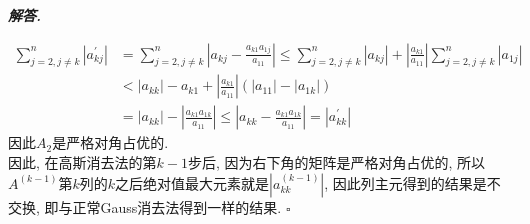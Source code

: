 \documentclass[10pt, a4paper, oneside]{ctexart}
\newenvironment{solution}{%
  \par\noindent\textbf{\textit{解答. }}\ignorespaces
}{%
  \hfill\ensuremath{\square}\par %
}
\begin{document}
\begin{solution}
\begin{align*}
    \sum_{j=2, j\neq k}^n |a_{kj}^{\prime}|& = \sum_{j=2, j\neq k}^n|a_{kj}-\frac{a_{k1}a_{1j}}{a_{11}} |\leq \sum_{j=2, j\neq k}^n|a_{kj}| + |\frac{a_{k1}}{a_{11}}|\sum_{j=2, j\neq k}^n |a_{1j}|\\
    &< |a_{kk}| - a_{k1} +  |\frac{a_{k1}}{a_{11}}| ( |a_{11}| - |a_{1k} |  ) \\&= |a_{kk}| - |\frac{a_{k1}a_{1k}}{a_{11}}| \leq |a_{kk}-\frac{a_{k1}a_{1k}}{a_{11}}| = |a_{kk}^{\prime}|
\end{align*}
因此$A_2$是严格对角占优的.\\
因此, 在高斯消去法的第$k-1$步后, 因为右下角的矩阵是严格对角占优的, 所以$A^{(k-1)}$第$k$列的$k$之后绝对值最大元素就是$|a_{kk}^{(k-1)}|$, 因此列主元得到的结果是不交换, 即与正常Gauss消去法得到一样的结果.
\end{solution}
\end{document}
